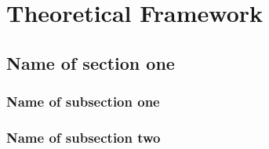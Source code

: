\chapter{Theoretical Framework}

\lipsum[4]

\section{Name of section one}

\lipsum

\subsection{Name of subsection one}

\lipsum

\subsection{Name of subsection two}

\lipsum
